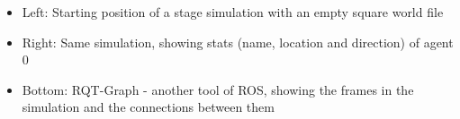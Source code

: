 \documentclass[a0,portrait]{a0poster}
\begin{document}
\begin{multicols}{2}

  \begin{itemize}
  \item Left: Starting position of a stage simulation with an empty square world file
  \item Right: Same simulation, showing stats (name, location and direction) of agent 0
  \item Bottom: RQT-Graph - another tool of ROS, showing the frames in the simulation and the connections between them
  \end{itemize}





\end{multicols}
\end{document}
